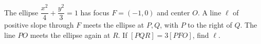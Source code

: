 The ellipse $\dfrac{x^2}{4}+\dfrac{y^2}{3}=1$ has focus $F=(-1,0)$ and center $O$. A line $\ell$ of positive slope through $F$ meets the ellipse at $P,Q$, with $P$ to the right of $Q$. The line $PO$ meets the ellipse again at $R$. If $[PQR]=3[PFO]$, find $\ell$.
